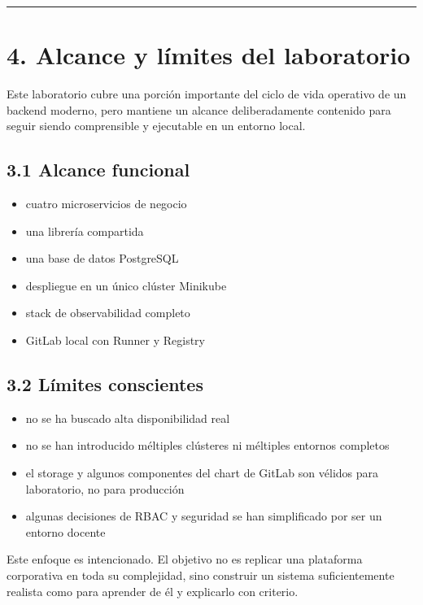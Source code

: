\documentclass[
a4paper,
12pt]{report}
\providecommand{\tightlist}{%
  \setlength{\itemsep}{0pt}\setlength{\parskip}{0pt}}
\begin{document}
\begin{center}\rule{0.5\linewidth}{0.5pt}\end{center}

\chapter{4. Alcance y límites del
laboratorio}\label{alcance-y-luxedmites-del-laboratorio}

Este laboratorio cubre una porción importante del ciclo de vida
operativo de un backend moderno, pero mantiene un alcance
deliberadamente contenido para seguir siendo comprensible y ejecutable
en un entorno local.

\section{3.1 Alcance funcional}\label{alcance-funcional}

\begin{itemize}
\tightlist
\item
  cuatro microservicios de negocio
\item
  una librería compartida
\item
  una base de datos PostgreSQL
\item
  despliegue en un único clúster Minikube
\item
  stack de observabilidad completo
\item
  GitLab local con Runner y Registry
\end{itemize}

\section{3.2 Límites conscientes}\label{luxedmites-conscientes}

\begin{itemize}
\tightlist
\item
  no se ha buscado alta disponibilidad real
\item
  no se han introducido méltiples clústeres ni méltiples entornos
  completos
\item
  el storage y algunos componentes del chart de GitLab son vélidos para
  laboratorio, no para producción
\item
  algunas decisiones de RBAC y seguridad se han simplificado por ser un
  entorno docente
\end{itemize}

Este enfoque es intencionado. El objetivo no es replicar una plataforma
corporativa en toda su complejidad, sino construir un sistema
suficientemente realista como para aprender de él y explicarlo con
criterio.
\end{document}
